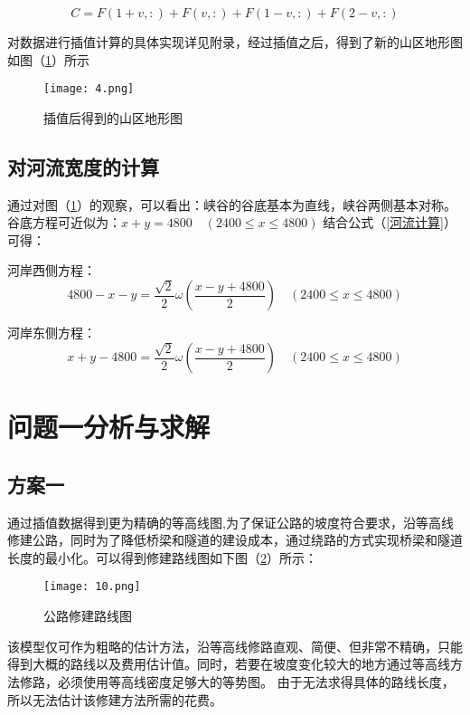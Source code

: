 \documentclass[bwprint]{cumcmthesis}
\begin{document}
$$ C = F(1+v,:)+F(v,:)+F(1-v,:)+F(2-v,:)$$

对数据进行插值计算的具体实现详见附录，经过插值之后，得到了新的山区地形图如图（\ref{插值后得到的山区地形图}）所示
\begin{figure}[h]
\small
\centering
\texttt{[image: 4.png]}
\caption{插值后得到的山区地形图} 
\label{插值后得到的山区地形图}
\end{figure}

\subsection{对河流宽度的计算}
通过对图（\ref{插值后得到的山区地形图}）的观察，可以看出：峡谷的谷底基本为直线，峡谷两侧基本对称。
谷底方程可近似为：$x+y = 4800 \quad (2400 \leqslant x \leqslant 4800)$
结合公式（\ref{河流计算}）可得：

河岸西侧方程：
\begin{equation}
	4800 - x - y = \frac{\sqrt{2}}{2}\omega \left(\frac{x-y+4800}{2} \right) \quad (2400 \leqslant x \leqslant 4800)
	\label{河岸西侧方程}
\end{equation}

河岸东侧方程：
\begin{equation}
	x + y - 4800 = \frac{\sqrt{2}}{2}\omega \left(\frac{x-y+4800}{2} \right) \quad (2400 \leqslant x \leqslant 4800)
	\label{河岸东侧方程}
\end{equation}

\section{问题一分析与求解}
\subsection{方案一}

通过插值数据得到更为精确的等高线图,为了保证公路的坡度符合要求，沿等高线修建公路，同时为了降低桥梁和隧道的建设成本，通过绕路的方式实现桥梁和隧道长度的最小化。可以得到修建路线图如下图（\ref{公路修建路线图}）所示：
\begin{figure}[h]
\small
\centering
\texttt{[image: 10.png]}
\caption{公路修建路线图} 
\label{公路修建路线图}
\end{figure}

该模型仅可作为粗略的估计方法，沿等高线修路直观、简便、但非常不精确，只能得到大概的路线以及费用估计值。同时，若要在坡度变化较大的地方通过等高线方法修路，必须使用等高线密度足够大的等势图。
由于无法求得具体的路线长度，所以无法估计该修建方法所需的花费。
\end{document}
